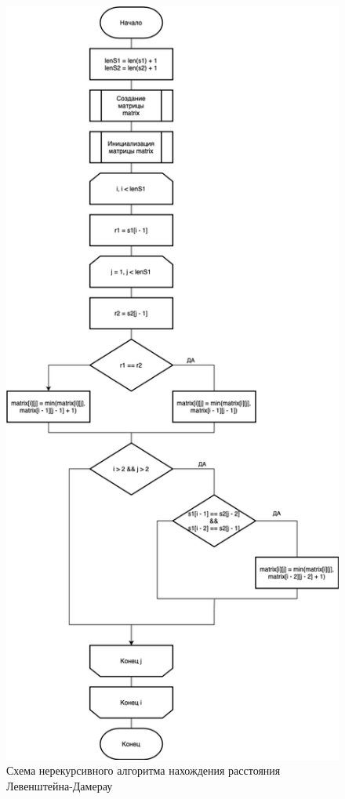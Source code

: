 \begin{figure}[h]
	\centering
	\includegraphics[width=0.65\linewidth]{img/DLM.jpg}
	\caption{Схема нерекурсивного алгоритма нахождения расстояния Левенштейна-Дамерау}
	\label{fig:mpr}
\end{figure}

\clearpage

